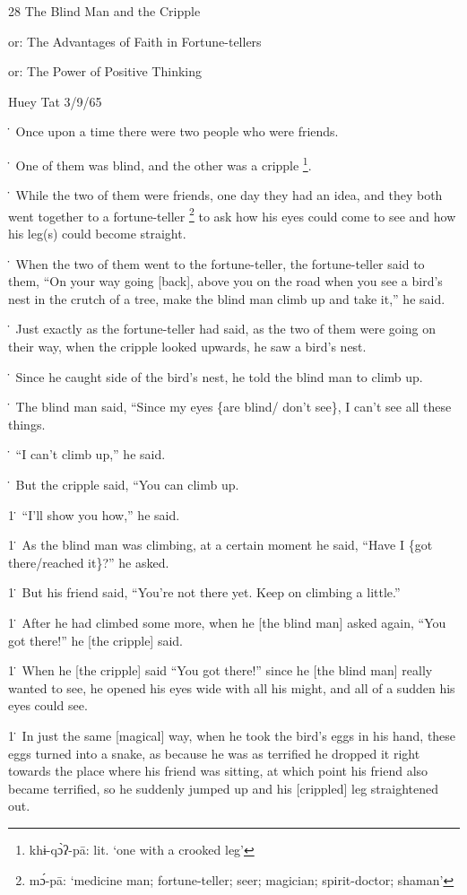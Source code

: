 
28 The Blind Man and the Cripple

or: The Advantages of Faith in Fortune-tellers

or: The Power of Positive Thinking

Huey Tat 3/9/65

\. Once upon a time there were two people who were friends.

\. One of them was blind, and the other was a cripple \footnote{khɨ-qɔ̀ʔ-pā: lit. `one with a crooked leg'}.

\. While the two of them were friends, one day they had an idea, and they both
went together to a fortune-teller \footnote{mɔ́-pā: `medicine man; fortune-teller; seer; magician; spirit-doctor; shaman'} to ask how his eyes could come to see and
how his leg(s) could become straight.

\. When the two of them went to the fortune-teller, the fortune-teller said to
them, ``On your way going [back], above you on the road when you see a bird's nest
in the crutch of a tree, make the blind man climb up and take it,'' he said.

\. Just exactly as the fortune-teller had said, as the two of them were going on
their way, when the cripple looked upwards, he saw a bird's nest.

\. Since he caught side of the bird's nest, he told the blind man to climb up.

\. The blind man said, ``Since my eyes \{are blind/ don't see\}, I can't see all
these things.

\. ``I can't climb up,'' he said.

\. But the cripple said, ``You can climb up.

1\. ``I'll show you how,'' he said.

1\. As the blind man was climbing, at a certain moment he said, ``Have I \{got
there/reached it\}?'' he asked.

1\. But his friend said, ``You're not there yet.  Keep on climbing a little.''

1\. After he had climbed some more, when he [the blind man] asked again, ``You
got there!'' he [the cripple] said.

1\. When he [the cripple] said ``You got there!'' since he [the blind man] really
wanted to see, he opened his eyes wide with all his might, and all of a sudden
his eyes could see.

1\. In just the same [magical] way, when he took the bird's eggs in his hand, these
eggs turned into a snake, as because he was as terrified he dropped it right towards
the place where his friend was sitting, at which point his friend also became terrified,
so he suddenly jumped up and his [crippled] leg straightened out.

